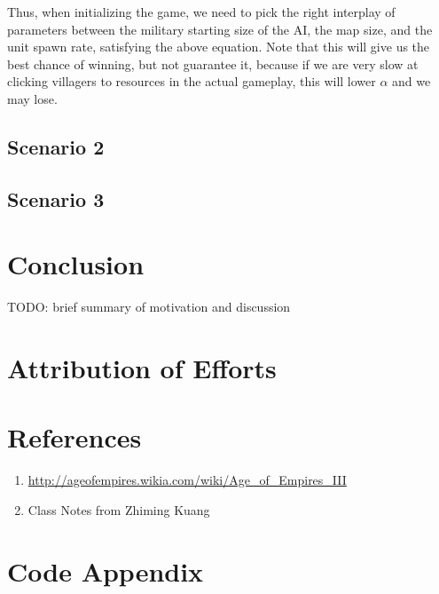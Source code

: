 \documentclass[12pt]{article}
\begin{document}
Thus, when initializing the game, we need to pick the right interplay of parameters between the military starting size of the AI, the map size, and the unit spawn rate, satisfying the above equation. Note that this will give us the best chance of winning, but not guarantee it, because if we are very slow at clicking villagers to resources in the actual gameplay, this will lower $\alpha$ and we may lose.

\subsection{Scenario 2}
\subsection{Scenario 3}

\section{Conclusion} 
TODO: brief summary of motivation and discussion

\section{Attribution of Efforts} 
\paragraph{}

\section{References} 
\begin{enumerate}
\item \url{http://ageofempires.wikia.com/wiki/Age_of_Empires_III}
\item Class Notes from Zhiming Kuang
\end{enumerate}

\section{Code Appendix} 
\end{document}
